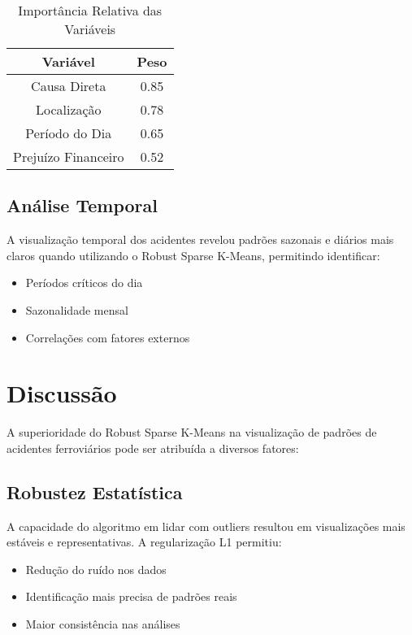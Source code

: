 \documentclass[conference]{IEEEtran}
\begin{document}
\begin{table}[h]
\caption{Importância Relativa das Variáveis}
\begin{center}
\begin{tabular}{|c|c|}
\hline
\textbf{Variável} & \textbf{Peso} \\
\hline
Causa Direta & 0.85 \\
Localização & 0.78 \\
Período do Dia & 0.65 \\
Prejuízo Financeiro & 0.52 \\
\hline
\end{tabular}
\end{center}
\end{table}

\subsection{Análise Temporal}
A visualização temporal dos acidentes revelou padrões sazonais e diários mais claros quando utilizando o Robust Sparse K-Means, permitindo identificar:

\begin{itemize}
\item Períodos críticos do dia
\item Sazonalidade mensal
\item Correlações com fatores externos
\end{itemize}

\section{Discussão}
A superioridade do Robust Sparse K-Means na visualização de padrões de acidentes ferroviários pode ser atribuída a diversos fatores:

\subsection{Robustez Estatística}
A capacidade do algoritmo em lidar com outliers resultou em visualizações mais estáveis e representativas. A regularização L1 permitiu:
\begin{itemize}
\item Redução do ruído nos dados
\item Identificação mais precisa de padrões reais
\item Maior consistência nas análises
\end{itemize}
\end{document}
